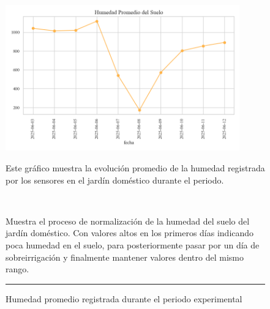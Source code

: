\documentclass[pdflatex,sn-mathphys-num]{sn-jnl}%
\theoremstyle{thmstyleone}%
\theoremstyle{thmstyletwo}%
\theoremstyle{thmstylethree}%
\begin{document}
\begin{figure}[!ht]
    \centering
    \includegraphics[width=0.9\textwidth]{assets/humedad_promedio.png}

    \caption{Humedad promedio registrada durante el periodo experimental}
    \label{fig:humedad_del_suelo}

    \vspace{0.4cm}

    \noindent
    \begin{minipage}[t]{0.5\textwidth}
        \raggedright
        Este gráfico muestra la evolución promedio de la humedad registrada por los sensores en el jardín doméstico durante el periodo.

        \
    \end{minipage}%
    \hfill
    \begin{minipage}[t]{0.5\textwidth}
        \justifying
        Muestra el proceso de normalización de la humedad del suelo del jardín doméstico. Con valores altos en los primeros días indicando poca humedad en el suelo, para posteriormente pasar por un día de sobreirrigación y finalmente mantener valores dentro del mismo rango.
    \end{minipage}

    \vspace{0.5cm}
    \hrule
\end{figure}
\end{document}
